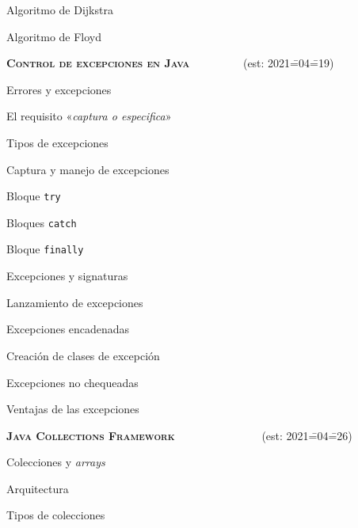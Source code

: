 \begin{longenum}
\begin{longenum}
\begin{longenum}
            \item Algoritmo de Dijkstra
            \item Algoritmo de Floyd
        \end{longenum}
    \end{longenum}
    \item \textbf{\textsc{Control de excepciones en Java}} \ \ \ \ \ \ \ \ \ (est: 2021\==04\==19)
    \begin{longenum}
        \item Errores y excepciones
        \item El requisito «\textit{captura o especifica}»
        \begin{longenum}
            \item Tipos de excepciones
        \end{longenum}
        \item Captura y manejo de excepciones
        \begin{longenum}
            \item Bloque \texttt{try}
            \item Bloques \texttt{catch}
            \item Bloque \texttt{finally}
        \end{longenum}
        \item Excepciones y signaturas
        \item Lanzamiento de excepciones
        \begin{longenum}
            \item Excepciones encadenadas
            \item Creación de clases de excepción
        \end{longenum}
        \item Excepciones no chequeadas
        \item Ventajas de las excepciones
    \end{longenum}
    \item \textbf{\textsc{Java Collections Framework}} \ \ \ \ \ \ \ \ \ \ \ \ \ \ \ (est: 2021\==04\==26)
    \begin{longenum}
        \item Colecciones y \textit{arrays}
        \item Arquitectura
        \item Tipos de colecciones
        \begin{longenum}

\end{longenum}
\end{longenum}
\end{longenum}
